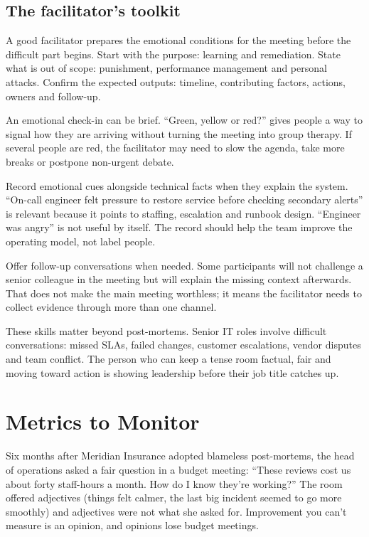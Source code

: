 \subsection{The facilitator's toolkit}


A good facilitator prepares the emotional conditions for the meeting before the difficult part begins. Start with the purpose: learning and remediation. State what is out of scope: punishment, performance management and personal attacks. Confirm the expected outputs: timeline, contributing factors, actions, owners and follow-up.


An emotional check-in can be brief. ``Green, yellow or red?'' gives people a way to signal how they are arriving without turning the meeting into group therapy. If several people are red, the facilitator may need to slow the agenda, take more breaks or postpone non-urgent debate.


Record emotional cues alongside technical facts when they explain the system. ``On-call engineer felt pressure to restore service before checking secondary alerts'' is relevant because it points to staffing, escalation and runbook design. ``Engineer was angry'' is not useful by itself. The record should help the team improve the operating model, not label people.


Offer follow-up conversations when needed. Some participants will not challenge a senior colleague in the meeting but will explain the missing context afterwards. That does not make the main meeting worthless; it means the facilitator needs to collect evidence through more than one channel.


These skills matter beyond post-mortems. Senior IT roles involve difficult conversations: missed SLAs, failed changes, customer escalations, vendor disputes and team conflict. The person who can keep a tense room factual, fair and moving toward action is showing leadership before their job title catches up.

\section{Metrics to Monitor}
Six months after Meridian Insurance adopted blameless post-mortems, the head of operations asked a fair question in a budget meeting: ``These reviews cost us about forty staff-hours a month. How do I know they're working?'' The room offered adjectives (things felt calmer, the last big incident seemed to go more smoothly) and adjectives were not what she asked for. Improvement you can't measure is an opinion, and opinions lose budget meetings.


